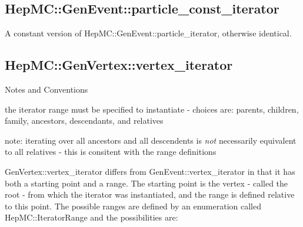 \documentclass[11pt,letterpaper]{article}
\begin{document}
\subsection{HepMC::GenEvent::particle\_const\_iterator}

A constant version of HepMC::GenEvent::particle\_iterator, otherwise
identical.

%
%

\subsection{HepMC::GenVertex::vertex\_iterator}
\begin{myitemize}{Notes and Conventions}
  \item the iterator range must be specified to instantiate -
    choices are: parents, children, family, ancestors, descendants,
    and relatives
  \item note: iterating over all ancestors and all descendents is {\it
      not} necessarily equivalent to all relatives - this is consitent
    with the range definitions
\end{myitemize}

GenVertex::vertex\_iterator differs from GenEvent::vertex\_iterator
in that it has both a starting point and a range. The starting point
is the vertex - called the root - from which the iterator was
instantiated, and the range is defined relative to this point.
The possible ranges are defined by an enumeration called
HepMC::IteratorRange and the possibilities are:
\begin{itemize}\setlength{\itemsep}{0pt}
\end{itemize}
\end{document}
